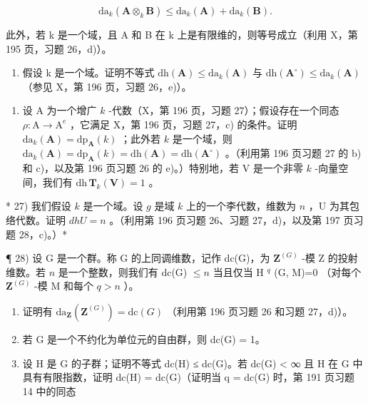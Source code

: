 \[
\mathrm{da} _ {k} (\mathbf {A} \otimes_ {k} \mathbf {B}) \leqslant \mathrm{da} _ {k} (\mathbf {A}) + \mathrm{da} _ {k} (\mathbf {B}).
\]

此外，若 k 是一个域，且 A 和 B 在 k 上是有限维的，则等号成立（利用 X，第 195 页，习题 26，d)）。

\begin{enumerate}
\def\labelenumi{\alph{enumi})}
\setcounter{enumi}{5}
\tightlist
\item
  假设 k 是一个域。证明不等式 \(\mathrm{dh}(\mathbf{A}) \leqslant \mathrm{da}_{k}(\mathbf{A})\) 与 \(\mathrm{dh}(\mathbf{A}^{\circ}) \leqslant \mathrm{da}_{k}(\mathbf{A})\) （参见 X，第 196 页，习题 26，e)）。
\end{enumerate}

\begin{enumerate}
\def\labelenumi{\arabic{enumi})}
\setcounter{enumi}{25}
\tightlist
\item
  设 A 为一个增广 \(k\) -代数（X，第 196 页，习题 27）；假设存在一个同态 \(\rho: \mathrm{A} \to \mathrm{A}^e\) ，它满足 X，第 196 页，习题 27，c) 的条件。证明 \(\mathrm{da}_k(\mathbf{A}) = \mathrm{dp}_\mathbf{A}(k)\) ；此外若 \(k\) 是一个域，则 \(\mathrm{da}_k(\mathbf{A}) = \mathrm{dp}_\mathbf{A}(k) = \mathrm{dh}(\mathbf{A}) = \mathrm{dh}(\mathbf{A}^\circ)\) 。（利用第 196 页习题 27 的 b) 和 c)，以及第 196 页习题 26 的 e)。）特别地，若 V 是一个非零 \(k\) -向量空间，我们有 \(\mathrm{dh}\,\mathbf{T}_k(\mathbf{V}) = 1\) 。
\end{enumerate}

* 27) 我们假设 \(k\) 是一个域。设 \(g\) 是域 \(k\) 上的一个李代数，维数为 \(n\) ，U 为其包络代数。证明 \(dhU = n\) 。（利用第 196 页习题 26、习题 27，d)，以及第 197 页习题 28，c)。）*

¶ 28) 设 G 是一个群。称 G 的上同调维数，记作 dc(G)，为 \(\mathbf{Z}^{(G)}\) -模 Z 的投射维数。若 \(n\) 是一个整数，则我们有 dc(G) \(\leqslant n\) 当且仅当 H \(^{q}\) (G, M)=0 （对每个 \(\mathbf{Z}^{(G)}\) -模 M 和每个 \(q > n\) ）。

\begin{enumerate}
\def\labelenumi{\alph{enumi})}
\item
  证明有 \(\mathrm{da}_{\mathbf{Z}}(\mathbf{Z}^{(G)}) = \mathrm{dc}(G)\) （利用第 196 页习题 26 和习题 27，d)）。
\item
  若 G 是一个不约化为单位元的自由群，则 dc(G) = 1。
\item
  设 H 是 G 的子群；证明不等式 dc(H) ≤ dc(G)。若 dc(G) \textless{} ∞ 且 H 在 G 中具有有限指数，证明 dc(H) = dc(G)（证明当 q = dc(G) 时，第 191 页习题 14 中的同态
\end{enumerate}

